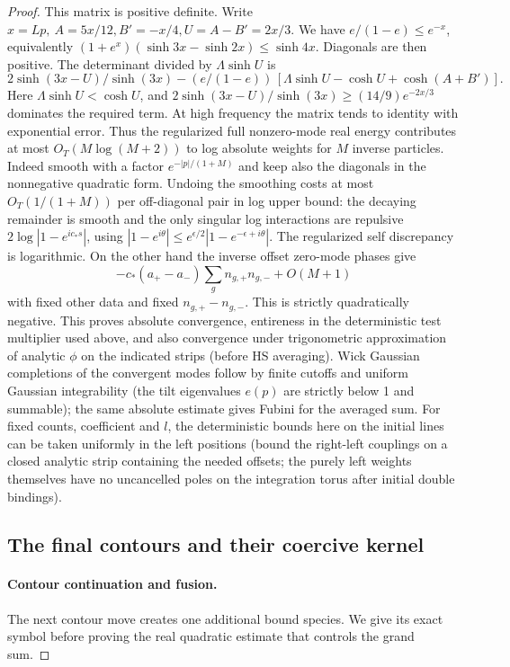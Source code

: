 \begin{proof}
This matrix is positive definite. Write \(x=Lp,\ A=5x/12,B'=-x/4,U=A-B'=2x/3\). We have \(e/(1-e)\le e^{-x}\), equivalently \((1+e^x)(\sinh3x-\sinh2x)\le\sinh4x\). Diagonals are then positive. The determinant divided by \(\Lambda\sinh U\) is
\[
 2\sinh(3x-U)/\sinh(3x)-
 (e/(1-e))\,[\Lambda\sinh U-\cosh U+\cosh(A+B')].
\]
Here \(\Lambda\sinh U<\cosh U\), and \(2\sinh(3x-U)/\sinh(3x)\ge(14/9)e^{-2x/3}\) dominates the required term. At high frequency the matrix tends to identity with exponential error. Thus the regularized full nonzero-mode real energy contributes at most \(O_T(M\log(M+2))\) to log absolute weights for \(M\) inverse particles. Indeed smooth with a factor \(e^{-|p|/(1+M)}\) and keep also the diagonals in the nonnegative quadratic form. Undoing the smoothing costs at most \(O_T(1/(1+M))\) per off-diagonal pair in log upper bound: the decaying remainder is smooth and the only singular log interactions are repulsive \(2\log|1-e^{ic_* s}|\), using \(|1-e^{i\theta}|\le e^{\epsilon/2}|1-e^{-\epsilon+i\theta}|\). The regularized self discrepancy is logarithmic. On the other hand the inverse offset zero-mode phases give
\[
 -c_*(a_+-a_-)\sum_g n_{g,+}n_{g,-}+O(M+1)
\]
with fixed other data and fixed \(n_{g,+}-n_{g,-}\). This is strictly quadratically negative. This proves absolute convergence, entireness in the deterministic test multiplier used above, and also convergence under trigonometric approximation of analytic \(\phi\) on the indicated strips (before HS averaging). Wick Gaussian completions of the convergent modes follow by finite cutoffs and uniform Gaussian integrability (the tilt eigenvalues \(e(p)\) are strictly below 1 and summable); the same absolute estimate gives Fubini for the averaged sum. For fixed counts, coefficient and \(l\), the deterministic bounds here on the initial lines can be taken uniformly in the left positions (bound the right-left couplings on a closed analytic strip containing the needed offsets; the purely left weights themselves have no uncancelled poles on the integration torus after initial double bindings).

\subsection{The final contours and their coercive kernel}
\paragraph{Contour continuation and fusion.}
The next contour move creates one additional bound species. We give its exact symbol before proving the real quadratic estimate that controls the grand sum.


\end{proof}

